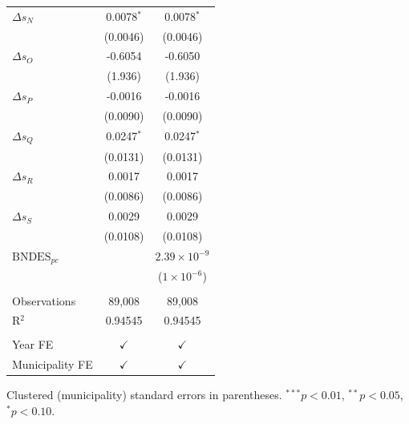 \begin{tabular}{lcc}
   $\Delta s_N$         & 0.0078$^{*}$   & 0.0078$^{*}$\\   
                        & (0.0046)       & (0.0046)\\   
   $\Delta s_O$         & -0.6054        & -0.6050\\   
                        & (1.936)        & (1.936)\\   
   $\Delta s_P$         & -0.0016        & -0.0016\\   
                        & (0.0090)       & (0.0090)\\   
   $\Delta s_Q$         & 0.0247$^{*}$   & 0.0247$^{*}$\\   
                        & (0.0131)       & (0.0131)\\   
   $\Delta s_R$         & 0.0017         & 0.0017\\   
                        & (0.0086)       & (0.0086)\\   
   $\Delta s_S$         & 0.0029         & 0.0029\\   
                        & (0.0108)       & (0.0108)\\   
   $\text{BNDES}_{pc}$  &                & $2.39\times 10^{-9}$\\    
                        &                & ($1\times 10^{-6}$)\\    
    \\
   Observations         & 89,008         & 89,008\\  
   R$^2$                & 0.94545        & 0.94545\\  
    \\
   Year FE              & $\checkmark$   & $\checkmark$\\   
   Municipality FE      & $\checkmark$   & $\checkmark$\\   
   \bottomrule
\end{tabular}
 
\par \raggedright 
Clustered (municipality) standard errors in parentheses. $^{***}p<0.01$, $^{**}p<0.05$, $^{*}p<0.10$.
\par\endgroup
